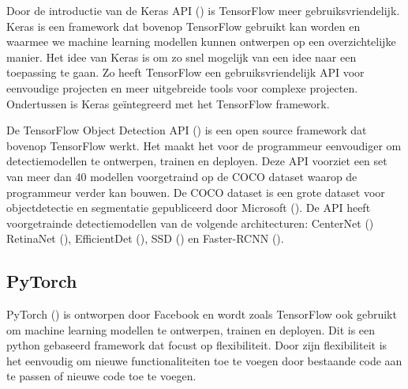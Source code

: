 Door de introductie van de Keras API (\cite{chollet2015keras}) is TensorFlow meer gebruiksvriendelijk.
Keras is een framework dat bovenop TensorFlow gebruikt kan worden en waarmee we machine learning modellen kunnen ontwerpen op een overzichtelijke manier.
Het idee van Keras is om zo snel mogelijk van een idee naar een toepassing te gaan.
Zo heeft TensorFlow een gebruiksvriendelijk API voor eenvoudige projecten en meer uitgebreide tools voor complexe projecten.
Ondertussen is Keras ge\"integreerd met het TensorFlow framework.


De TensorFlow Object Detection API (\cite{tensorflow2015-whitepaper}) is een open source framework dat bovenop TensorFlow werkt. 
Het maakt het voor de programmeur eenvoudiger om detectiemodellen te ontwerpen, trainen en deployen.
Deze API voorziet een set van meer dan 40 modellen voorgetraind op de COCO dataset waarop de programmeur verder kan bouwen. 
De COCO dataset is een grote dataset voor objectdetectie en segmentatie gepubliceerd door Microsoft (\cite{lin2015microsoft}).
De API heeft voorgetrainde detectiemodellen van de volgende architecturen: CenterNet (\cite{duan_centernet_2019}) RetinaNet (\cite{lin_focal_2018}), EfficientDet (\cite{tan_efficientdet_2020}), SSD (\cite{liu_ssd_2016}) en Faster-RCNN (\cite{ren_faster_2016}).

\subsection{PyTorch}
PyTorch (\cite{li_PyTorch_2020}) is ontworpen door Facebook en wordt zoals TensorFlow ook gebruikt om machine learning modellen te ontwerpen, trainen en deployen.
Dit is een python gebaseerd framework dat focust op flexibiliteit.
Door zijn flexibiliteit is het eenvoudig om nieuwe functionaliteiten toe te voegen door bestaande code aan te passen of nieuwe code toe te voegen.

